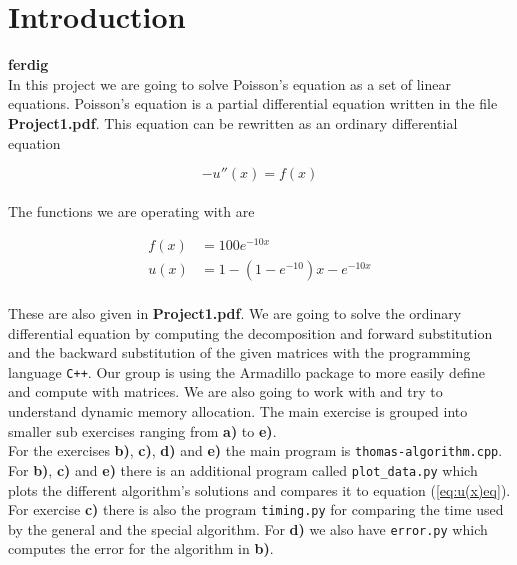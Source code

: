 \documentclass{article}
\begin{document}
\vspace{1cm}

\section{Introduction} \label{sec:Introduction}

{\large \bf ferdig} \\

In this project we are going to solve Poisson's equation as a set of linear equations. Poisson's equation is a partial differential equation written in the file \textbf{Project1.pdf}. This equation can be rewritten as an ordinary differential equation

\begin{equation}
  - u''(x) = f(x)   \label{eq:u(x)diffeq}
\end{equation} \\

The functions we are operating with are

\begin{align}
  f(x) &= 100 e ^{-10 x}    \label{eq:f(x)eq} \\
  u(x) &= 1 - (1- e ^{-10}) x - e ^{- 10 x} \label{eq:u(x)eq}
\end{align} \\

These are also given in \textbf{Project1.pdf}. We are going to solve the ordinary differential equation by computing the decomposition and forward substitution and the backward substitution of the given matrices with the programming language \texttt{C++}. Our group is using the Armadillo package to more easily define and compute with matrices. We are also going to work with and try to understand dynamic memory allocation. The main exercise is grouped into smaller sub exercises ranging from \textbf{a)} to \textbf{e)}. \\

For the exercises \textbf{b)}, \textbf{c)}, \textbf{d)} and \textbf{e)} the main program is \texttt{thomas-algorithm.cpp}. For \textbf{b)}, \textbf{c)} and \textbf{e)} there is an additional program called \texttt{plot\_data.py} which plots the different algorithm's solutions and compares it to equation (\ref{eq:u(x)eq}). For exercise \textbf{c)} there is also the program \texttt{timing.py} for comparing the time used by the general and the special algorithm. For \textbf{d)} we also have \texttt{error.py} which computes the error for the algorithm in \textbf{b)}. \\
\end{document}
